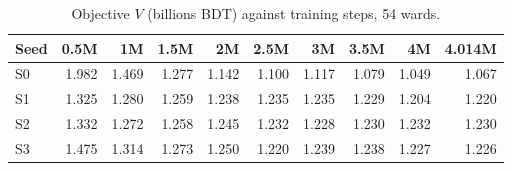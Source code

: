 \begin{table}[htbp]
\centering\small
\caption{Objective $V$ (billions BDT) against training steps, 54 wards.}
\label{tab:convergence_dncc}
\begin{tabular}{lrrrrrrrrr}
\toprule
Seed & 0.5M & 1M & 1.5M & 2M & 2.5M & 3M & 3.5M & 4M & 4.014M \\
\midrule
S0 & 1.982 & 1.469 & 1.277 & 1.142 & 1.100 & 1.117 & 1.079 & 1.049 & 1.067 \\
S1 & 1.325 & 1.280 & 1.259 & 1.238 & 1.235 & 1.235 & 1.229 & 1.204 & 1.220 \\
S2 & 1.332 & 1.272 & 1.258 & 1.245 & 1.232 & 1.228 & 1.230 & 1.232 & 1.230 \\
S3 & 1.475 & 1.314 & 1.273 & 1.250 & 1.220 & 1.239 & 1.238 & 1.227 & 1.226 \\
\bottomrule
\end{tabular}
\end{table}

